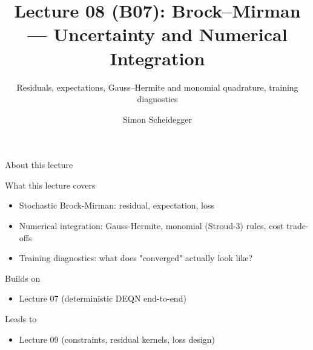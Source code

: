 \documentclass[aspectratio=169,11pt]{beamer}
\title[Lecture 08 (B07)]{Lecture 08 (B07): Brock--Mirman --- Uncertainty and Numerical Integration}
\subtitle{Residuals, expectations, Gauss--Hermite and monomial quadrature, training diagnostics}
\author{Simon Scheidegger}
\institute{HEC, University of Lausanne}
\date{}
\begin{document}
\providecommand{\exercisepause}{%
  \tikz[baseline=(X.base)]{\node[fill=darkgreen!80!black, text=white,
  rounded corners=2pt, inner sep=3pt, font=\scriptsize\bfseries](X){PAUSE};}}

{
\begin{frame}
\titlepage
\end{frame}
}

\begin{frame}{About this lecture}
\small
\begin{block}{What this lecture covers}
\begin{itemize}\itemsep2pt
  \item Stochastic Brock-Mirman: residual, expectation, loss
  \item Numerical integration: Gauss-Hermite, monomial (Stroud-3) rules, cost trade-offs
  \item Training diagnostics: what does "converged" actually look like?
\end{itemize}
\end{block}
\begin{block}{Builds on}
\begin{itemize}\itemsep2pt
  \item Lecture 07 (deterministic DEQN end-to-end)
\end{itemize}
\end{block}
\begin{block}{Leads to}
\begin{itemize}\itemsep2pt
  \item Lecture 09 (constraints, residual kernels, loss design)
\end{itemize}
\end{block}
\end{frame}
\end{document}
